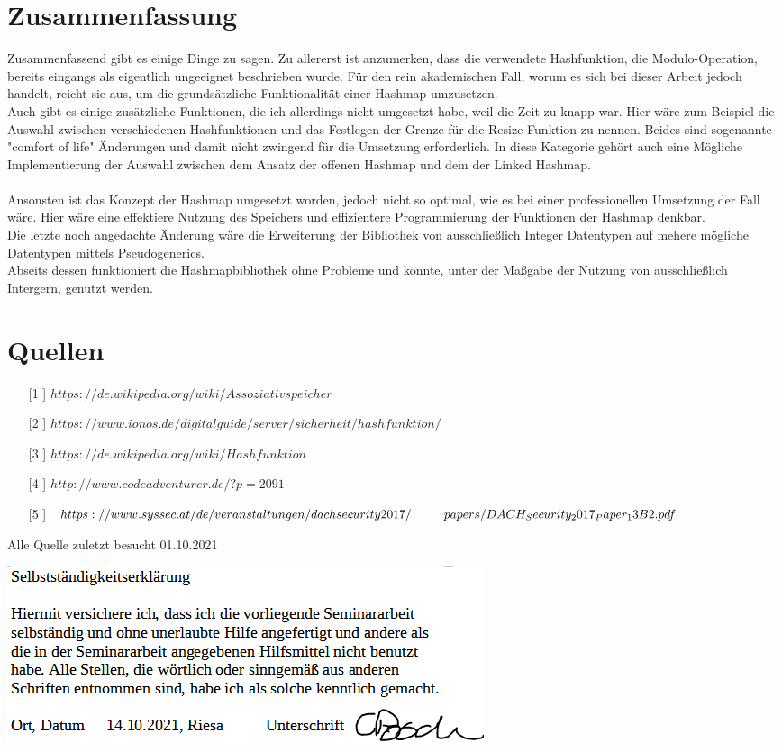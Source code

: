 \documentclass[11pt,a4paper]{article}
\begin{document}
\section{Zusammenfassung}
Zusammenfassend gibt es einige Dinge zu sagen. 
Zu allererst ist anzumerken, dass die verwendete Hashfunktion, die Modulo-Operation,
bereits eingangs als eigentlich ungeeignet beschrieben wurde. Für den rein akademischen Fall, worum es sich bei dieser Arbeit jedoch 
handelt, reicht sie aus, um die grundsätzliche Funktionalität einer Hashmap umzusetzen.\\
Auch gibt es einige zusätzliche Funktionen, die ich allerdings nicht umgesetzt habe, weil die Zeit zu knapp war.
Hier wäre zum Beispiel die Auswahl zwischen verschiedenen Hashfunktionen und das Festlegen der Grenze für die Resize-Funktion zu nennen.
Beides sind sogenannte "comfort of life" Änderungen und damit nicht zwingend für die Umsetzung erforderlich.
In diese Kategorie gehört auch eine Mögliche Implementierung der Auswahl zwischen dem Ansatz der offenen Hashmap und dem der Linked Hashmap.\\\\
Ansonsten ist das Konzept der Hashmap umgesetzt worden, jedoch nicht so optimal, wie es bei einer professionellen Umsetzung der Fall wäre.
Hier wäre eine effektiere Nutzung des Speichers und effizientere Programmierung der Funktionen der Hashmap denkbar.\\
Die letzte noch angedachte Änderung wäre die Erweiterung der Bibliothek von ausschließlich Integer Datentypen auf 
mehere mögliche Datentypen mittels Pseudogenerics.\\
Abseits dessen funktioniert die Hashmapbibliothek ohne Probleme und könnte, unter der Maßgabe der Nutzung von ausschließlich Intergern, genutzt werden.

\section{Quellen}
\begin{itemize}
\item[[1]] $https://de.wikipedia.org/wiki/Assoziativspeicher$
\item[[2]] $https://www.ionos.de/digitalguide/server/sicherheit/hashfunktion/$
\item[[3]] $https://de.wikipedia.org/wiki/Hashfunktion$
\item[[4]] $http://www.codeadventurer.de/?p=2091$
\item[[5]] $https://www.syssec.at/de/veranstaltungen/dachsecurity2017/ \\
            ~~~~~~~~papers/DACH_Security_2017_Paper_13B2.pdf$
\end{itemize}
\centering 
Alle Quelle zuletzt besucht 01.10.2021

\pagebreak

\includegraphics[scale=1]{Bilder/sse.PNG}
\end{document}
